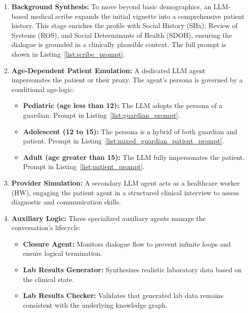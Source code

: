 \begin{enumerate} 
\item \textbf{Background Synthesis:} To move beyond basic demographics, an LLM-based medical scribe expands the initial vignette into a comprehensive patient history. This stage enriches the profile with Social History (SHx), Review of Systems (ROS), and Social Determinants of Health (SDOH), ensuring the dialogue is grounded in a clinically plausible context. The full prompt is shown in Listing~\ref{list:scribe_prompt}.

\item \textbf{Age-Dependent Patient Emulation:} A dedicated LLM agent impersonates the patient or their proxy. The agent's persona is governed by a conditional age-logic: 
    \begin{itemize} 
    \item \textbf{Pediatric (age less than 12):} The LLM adopts the persona of a guardian. Prompt in Listing~\ref{list:guardian_prompt}.
    \item \textbf{Adolescent (12 to 15):} The persona is a hybrid of both guardian and patient. Prompt in Listing~\ref{list:mixed_guardian_patient_prompt}.
    \item \textbf{Adult (age greater than 15):} The LLM fully impersonates the patient. Prompt in Listing~\ref{list:patient_prompt}.
    \end{itemize}

\item \textbf{Provider Simulation:} A secondary LLM agent acts as a healthcare worker (HW), engaging the patient agent in a structured clinical interview to assess diagnostic and communication skills. 
\item \textbf{Auxiliary Logic:} Three specialized auxiliary agents manage the conversation's lifecycle: 
    \begin{itemize} 
    \item \textbf{Closure Agent:} Monitors dialogue flow to prevent infinite loops and ensure logical termination. 
    \item \textbf{Lab Results Generator:} Synthesizes realistic laboratory data based on the clinical state.
    \item \textbf{Lab Results Checker:} Validates that generated lab data remains consistent with the underlying knowledge graph. 
    \end{itemize} 
\end{enumerate}

